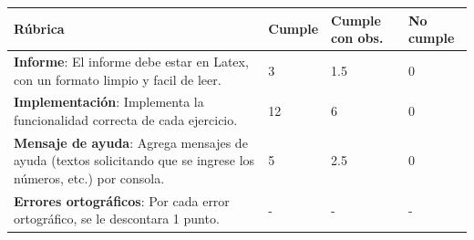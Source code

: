 \documentclass{article}
\begin{document}
	\begin{table}[hbt!]
		\setlength{\tabcolsep}{0.5em} %
		{\renewcommand{\arraystretch}{1.5}%
		\begin{tabular}{|p{5cm}|x{3cm}|x{3cm}|x{3cm}|}
			\hline 
			\textbf{Rúbrica} & \textbf{Cumple}  & \textbf{Cumple con obs.}  & \textbf{No cumple} \\
			\hline 
			\textbf{Informe}: El informe debe estar en Latex, con un formato limpio y facil de leer.  & 3 & 1.5 & 0   \\ 
			\hline 
			\textbf{Implementación}: Implementa la funcionalidad correcta de cada ejercicio.  & 12 & 6 & 0   \\ \hline
			\textbf{Mensaje de ayuda}: Agrega mensajes de ayuda (textos solicitando que se ingrese los números, etc.) por consola.  & 5 & 2.5 & 0   \\ \hline
			
							
			
			\textbf{Errores ortográficos}: Por cada error ortográfico, se le descontara 1 punto.  & - & - & -   \\ \hline
			
		\end{tabular}
	}
	\end{table}
	
	
	
	
	
	
	
\end{document}
